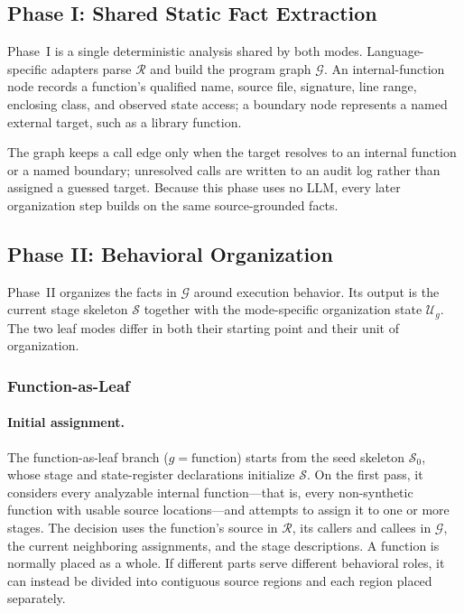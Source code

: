 \documentclass[]{ailab}
\newcommand{\hbsmall}{\textsf{function-as-leaf}}
\begin{document}
\subsection{Phase I: Shared Static Fact Extraction}

Phase~I is a single deterministic analysis shared by both modes.
Language-specific adapters parse $\mathcal{R}$ and build the program graph
$\mathcal{G}$. An internal-function node records a function's qualified name,
source file, signature, line range, enclosing class, and observed state access;
a boundary node represents a named external target, such as a library function.

The graph keeps a call edge only when the target resolves to an internal
function or a named boundary; unresolved calls are written to an audit log
rather than assigned a guessed target. Because this phase uses no LLM, every
later organization step builds on the same source-grounded facts.

\subsection{Phase II: Behavioral Organization}

Phase~II organizes the facts in $\mathcal{G}$ around execution behavior. Its
output is the current stage skeleton $\mathcal{S}$ together with the
mode-specific organization state $\mathcal{U}_g$. The two leaf modes differ in
both their starting point and their unit of organization.

\subsubsection{Function-as-Leaf}

\paragraph{Initial assignment.}
The \hbsmall{} branch ($g=\mathrm{function}$) starts from the seed skeleton
$\mathcal{S}_0$, whose stage and state-register declarations initialize
$\mathcal{S}$. On the first pass, it considers every analyzable
internal function---that is, every non-synthetic function with usable source
locations---and attempts to assign it to one or more stages. The decision uses
the function's source in $\mathcal{R}$, its callers and callees in $\mathcal{G}$,
the current neighboring assignments, and the stage descriptions. A function is
normally placed as a whole. If different parts serve different behavioral roles,
it can instead be divided into contiguous source regions and each region placed
separately.
\end{document}
